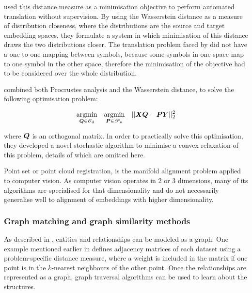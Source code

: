 \cite{Zhang2017EarthMD} used this distance measure as a minimisation objective to perform automated translation without supervision. By using the Wasserstein distance as a measure of distribution closeness, where the distributions are the source and target embedding spaces, they formulate a system in which minimisation of this distance draws the two distributions closer. The translation problem faced by \cite{Zhang2017EarthMD} did not have a one-to-one mapping between symbols, because some symbols in one space map to one symbol in the other space, therefore the minimisation of the objective had to be considered over the whole distribution. 

\cite{UnsupervisedAlignmentWP} combined both Procrustes analysis and the Wasserstein distance, to solve the following optimisation problem:

\begin{equation}
\begin{split}
\underset{\boldsymbol{Q} \in \mathscr{O}_d}{\operatorname{argmin}} \quad \underset{\boldsymbol{P} \in \mathscr{P}_n }{\operatorname{argmin}}\quad || \boldsymbol{X} \boldsymbol{Q} - \boldsymbol{P} \boldsymbol{Y}||_2^2
\end{split}
\end{equation}

where $\boldsymbol{Q}$ is an orthogonal matrix. In order to practically solve this optimisation, they developed a novel stochastic algorithm to minimise a convex relaxation of this problem, details of which are omitted here. 

Point set or point cloud registration, is the manifold alignment problem applied to computer vision. As computer vision operates in 2 or 3 dimensions, many of its algorithms are specialised for that dimensionality and do not necessarily generalise well to alignment of embeddings with higher dimensionality. 

\subsubsection{Graph matching and graph similarity methods}

As described in \cite{kalinowski2020survey}, entities and relationships can be modeled as a graph. One example mentioned earlier in  \cite{ManifoldLearningTheoryAndApplications} defines adjacency matrices of each dataset using a problem-specific distance measure, where a weight is included in the matrix if one point is in the $k$-nearest neighbours of the other point. Once the relationships are represented as a graph, graph traversal algorithms can be used to learn about the structures. 

